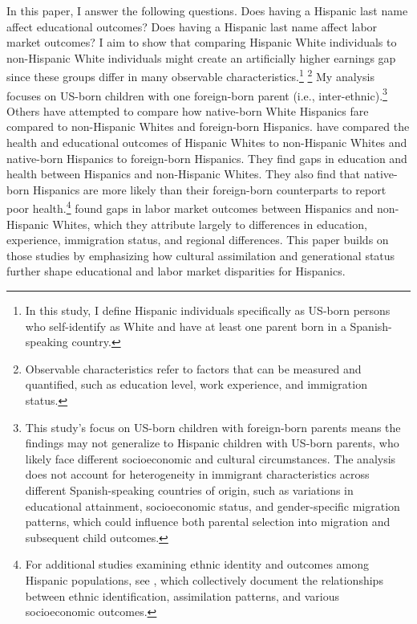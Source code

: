 In this paper, I answer the following questions. Does having a Hispanic last name affect educational outcomes? Does having a Hispanic last name affect labor market outcomes? I aim to show that comparing Hispanic White individuals to non-Hispanic White individuals might create an artificially higher earnings gap since these groups differ in many observable characteristics.\footnote{In this study, I define Hispanic individuals specifically as US-born persons who self-identify as White and have at least one parent born in a Spanish-speaking country.} \footnote{Observable characteristics refer to factors that can be measured and quantified, such as education level, work experience, and immigration status.} My analysis focuses on US-born children with one foreign-born parent (i.e., inter-ethnic).\footnote{This study's focus on US-born children with foreign-born parents means the findings may not generalize to Hispanic children with US-born parents, who likely face different socioeconomic and cultural circumstances. The analysis does not account for heterogeneity in immigrant characteristics across different Spanish-speaking countries of origin, such as variations in educational attainment, socioeconomic status, and gender-specific migration patterns, which could influence both parental selection into migration and subsequent child outcomes.} Others have attempted to compare how native-born White Hispanics fare compared to non-Hispanic Whites and foreign-born Hispanics. \cites{antman2020ethnic} have compared the health and educational outcomes of Hispanic Whites to non-Hispanic Whites and native-born Hispanics to foreign-born Hispanics. They find gaps in education and health between Hispanics and non-Hispanic Whites. They also find that native-born Hispanics are more likely than their foreign-born counterparts to report poor health.\footnote{For additional studies examining ethnic identity and outcomes among Hispanic populations, see \textcite{antman2020ethnic,antmanEthnicAttritionObserved2016,antmanEthnicAttritionObserved2016a,antmanEthnicAttritionAssimilation2020}, which collectively document the relationships between ethnic identification, assimilation patterns, and various socioeconomic outcomes.} \textcite{davilaChangesRelativeEarnings2008} found gaps in labor market outcomes between Hispanics and non-Hispanic Whites, which they attribute largely to differences in education, experience, immigration status, and regional differences. This paper builds on those studies by emphasizing how cultural assimilation and generational status further shape educational and labor market disparities for Hispanics.

